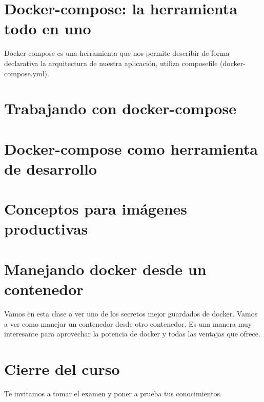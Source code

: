 \documentclass{article}
\begin{document}
\section{Docker-compose: la herramienta todo en uno}%
Docker compose es una herramienta que nos permite describir de forma
declarativa la arquitectura de nuestra aplicación, utiliza composefile
(docker-compose.yml).\\

\section{Trabajando con docker-compose}%


\section{Docker-compose como herramienta de desarrollo}%


\section{Conceptos para imágenes productivas}%


\section{Manejando docker desde un contenedor}%
Vamos en esta clase a ver uno de los secretos mejor guardados de docker. Vamos
a ver como manejar un contenedor desde otro contenedor. Es una manera muy
interesante para aprovechar la potencia de docker y todas las ventajas que
ofrece.\\


\section{Cierre del curso}%
Te invitamos a tomar el examen y poner a prueba tus conocimientos.
\end{document}

